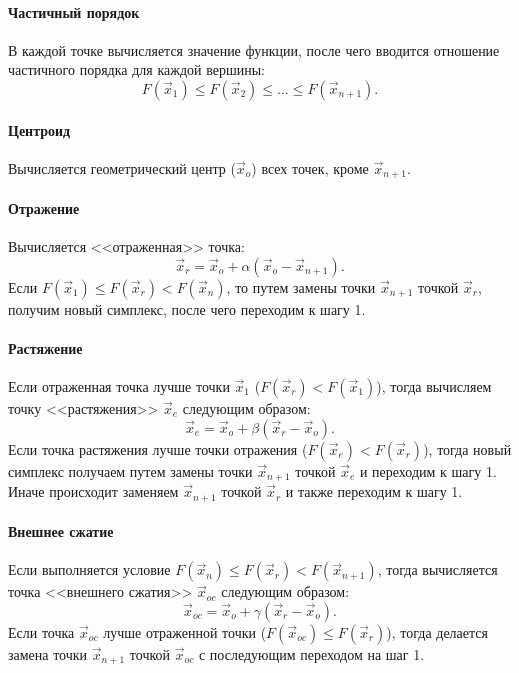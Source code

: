 \paragraph{Частичный порядок}\par
\noindent\indent В каждой точке вычисляется значение функции, после чего вводится
отношение частичного порядка для каждой вершины:
\begin{equation}
  F(\vec{x}_1) \leq F(\vec{x}_2) \leq ... \leq F(\vec{x}_{n+1}).
\end{equation}
\paragraph{Центроид}
\noindent\indent Вычисляется геометрический центр ($\vec{x}_{o}$) всех точек,
кроме $\vec{x}_{n+1}$.
\paragraph{Отражение}
\noindent\indent Вычисляется <<отраженная>> точка:
\begin{equation}
  \vec{x}_r = \vec{x}_o + \alpha(\vec{x}_o - \vec{x}_{n+1}).
\end{equation}
Если $F(\vec{x}_1) \leq F(\vec{x}_r) < F(\vec{x}_n)$, то
путем замены точки $\vec{x}_{n+1}$ точкой $\vec{x}_r$, получим новый симплекс,
после чего переходим к шагу 1.
\paragraph{Растяжение}
\noindent\indent Если отраженная точка лучше точки $\vec{x}_1$
($F(\vec{x}_r) < F(\vec{x}_1) $), тогда вычисляем точку <<растяжения>>
$\vec{x}_e$ следующим образом:
\begin{equation}
  \vec{x}_e = \vec{x}_o + \beta(\vec{x}_r - \vec{x}_o).
\end{equation}
Если точка растяжения лучше точки отражения ($F(\vec{x}_e) < F(\vec{x}_r)$),
тогда новый симплекс получаем путем замены точки $\vec{x}_{n+1}$ точкой
$\vec{x}_e$ и переходим к шагу 1.
Иначе происходит заменяем $\vec{x}_{n+1}$ точкой $\vec{x}_r$ и также переходим
к шагу 1.
\paragraph{Внешнее сжатие}
\noindent\indent Если выполняется условие $F(\vec{x}_n) \leq F(\vec{x}_r) < F(\vec{x}_{n+1})$,
тогда вычисляется точка <<внешнего сжатия>> $\vec{x}_{oc}$ следующим образом:
\begin{equation}
  \vec{x}_{oc} = \vec{x}_o + \gamma(\vec{x}_{r} - \vec{x}_o).
\end{equation}
Если точка $\vec{x}_{oc}$ лучше отраженной точки ($F(\vec{x}_{oc}) \leq F(\vec{x}_{r})$),
тогда делается замена точки $\vec{x}_{n+1}$ точкой $\vec{x}_{oc}$ с последующим
переходом на шаг 1.
